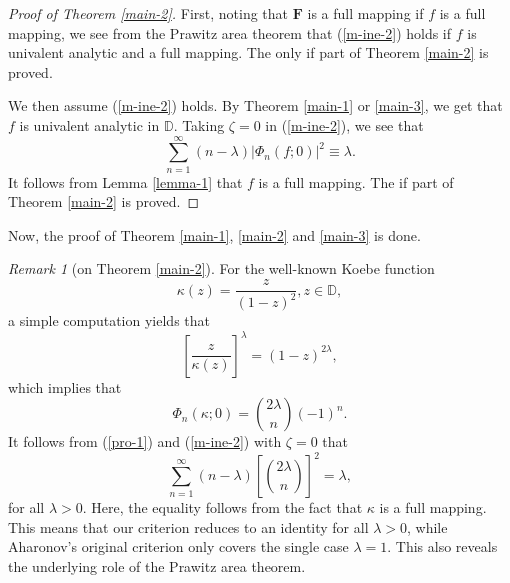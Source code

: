 \documentclass[10pt]{amsart}
\theoremstyle{definition}
\theoremstyle{remark}
\newtheorem{remark}[theorem]{Remark}
\numberwithin{equation}{section}
\begin{document}
\begin{proof}[Proof of Theorem \ref{main-2}]
First, noting that $\mathbf{F}$ is a full mapping if $f$ is a full mapping, we see from the Prawitz area theorem that (\ref{m-ine-2}) holds if $f$ is univalent analytic and a full mapping.
The only if part of Theorem \ref{main-2} is proved. 

We then assume (\ref{m-ine-2}) holds. By Theorem \ref{main-1} or \ref{main-3}, we get that $f$ is univalent analytic in $\mathbb{D}$. Taking $\zeta=0$ in (\ref{m-ine-2}), we see that 
\begin{equation}
\sum_{n=1}^{\infty}(n-\lambda)\left|\Phi_{n}(f; 0)\right|^2\equiv \lambda. \nonumber
\end{equation}
It follows from Lemma \ref{lemma-1} that $f$ is a full mapping.  The if part of Theorem \ref{main-2} is proved. 
\end{proof}
Now,  the proof of Theorem \ref{main-1}, \ref{main-2} and \ref{main-3} is done. 

\begin{remark}[on Theorem \ref{main-2}]
For the well-known Koebe function 
\[\kappa(z)=\frac{z}{(1-z)^2}, z\in \mathbb{D},\]
a simple computation yields that 
\[
\left[\frac{z}{\kappa(z)}\right]^\lambda = (1-z)^{2\lambda},\]
which implies that 
\[
\Phi_n(\kappa;0)=\binom{2\lambda}{n}(-1)^n.
\]
It follows from (\ref{pro-1}) and (\ref{m-ine-2}) with $\zeta=0$ that 
\[
\sum_{n=1}^{\infty}(n-\lambda)\left[\binom{2\lambda}{n}\right]^2=\lambda, \]
for all \(\lambda>0\). Here, the equality follows from the fact that $\kappa$ is a full mapping.
This means that our criterion reduces to an identity for all $\lambda>0$, while Aharonov's original criterion only covers the single case $\lambda=1$. This also reveals the underlying role of the Prawitz area theorem.
\end{remark}
\end{document}
